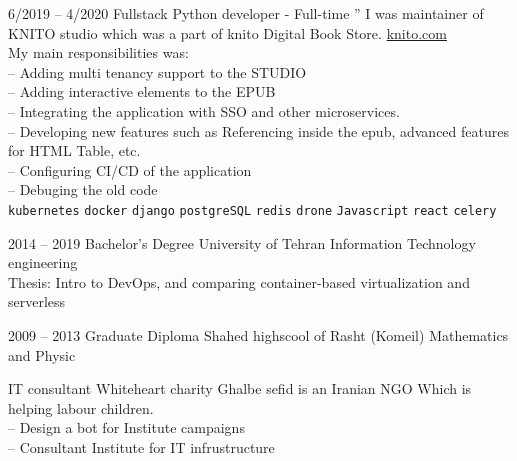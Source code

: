 \documentclass[9pt]{developercv}
\begin{document}
\begin{entrylist}
{	}
	\entry
	{6/2019 -- 4/2020}
	{Fullstack Python developer - Full-time}
	{''}
	{
		I was maintainer of KNITO studio which was a part of knito Digital Book Store.
		\href{https://knito.com/}{knito.com} \\
		My main responsibilities was: \\
		-- Adding multi tenancy support to the STUDIO \\
		-- Adding interactive elements to the EPUB \\
		-- Integrating the application with SSO and other microservices. \\
		-- Developing new features such as Referencing inside the epub, advanced features for HTML Table, etc. \\
		-- Configuring CI/CD of the application \\
		-- Debuging the old code \\
		\texttt{kubernetes}\slashsep
		\texttt{docker}\slashsep
		\texttt{django}\slashsep
		\texttt{postgreSQL}\slashsep
		\texttt{redis}\slashsep
		\texttt{drone}\slashsep
		\texttt{Javascript}\slashsep
		\texttt{react}\slashsep
		\texttt{celery}
	}
\end{entrylist}


\begin{entrylist}
	\entry
	{2014 -- 2019}
	{Bachelor's Degree}
	{University of Tehran}
	{Information Technology engineering\\
		Thesis: Intro to DevOps, and comparing container-based virtualization and serverless
	}
\end{entrylist}

\begin{entrylist}
	\entry
	{2009 -- 2013}
	{Graduate Diploma}
	{Shahed highscool of Rasht (Komeil)}
	{Mathematics and Physic \\}
\end{entrylist}


\begin{entrylist}
	\entry
	{}
	{IT consultant}
	{Whiteheart charity}
	{Ghalbe sefid is an Iranian NGO Which is helping labour children. \\
		-- Design a bot for Institute campaigns \\
		-- Consultant Institute for IT infrustructure}
\end{entrylist}

\end{document}
